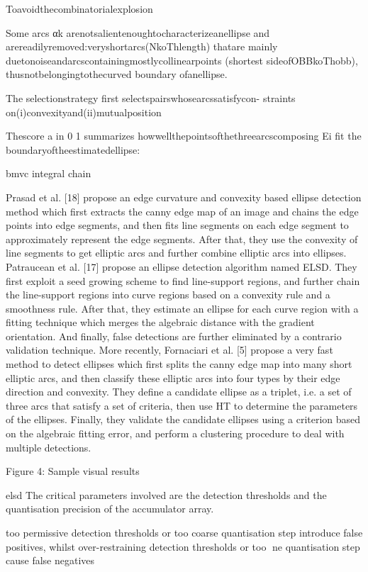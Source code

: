\documentclass[a4paper]{report}
\begin{document}
Toavoidthecombinatorialexplosion

Some arcs αk arenotsalientenoughtocharacterizeanellipse
and arereadilyremoved:veryshortarcs(NkoThlength) thatare
mainly duetonoiseandarcscontainingmostlycollinearpoints
(shortest sideofOBBkoThobb), thusnotbelongingtothecurved
boundary ofanellipse.

The selectionstrategy first selectspairswhosearcssatisfycon-
straints on(i)convexityand(ii)mutualposition


Thescore a in 0 1
summarizes howwellthepointsofthethreearcscomposing Ei fit
the boundaryoftheestimatedellipse:

bmvc integral chain

Prasad et al. [18] propose an edge curvature and convexity
based ellipse detection method which first extracts the canny edge map of an image
and chains the edge points into edge segments, and then fits line segments on each edge
segment to approximately represent the edge segments. After that, they use the convexity of
line segments to get elliptic arcs and further combine elliptic arcs into ellipses. Patraucean
et al. [17] propose an ellipse detection algorithm named ELSD. They first exploit a seed
growing scheme to find line-support regions, and further chain the line-support regions into
curve regions based on a convexity rule and a smoothness rule. After that, they estimate an
ellipse for each curve region with a fitting technique which merges the algebraic distance
with the gradient orientation. And finally, false detections are further eliminated by a contrario
validation technique. More recently, Fornaciari et al. [5] propose a very fast method
to detect ellipses which first splits the canny edge map into many short elliptic arcs, and then
classify these elliptic arcs into four types by their edge direction and convexity. They define
a candidate ellipse as a triplet, i.e. a set of three arcs that satisfy a set of criteria, then use
HT to determine the parameters of the ellipses. Finally, they validate the candidate ellipses
using a criterion based on the algebraic fitting error, and perform a clustering procedure to
deal with multiple detections.


Figure 4: Sample visual results


elsd
The critical parameters involved are the detection thresholds and the quantisation precision
of the accumulator array.

too permissive detection thresholds
or too coarse quantisation step introduce false positives, whilst over-restraining
detection thresholds or too ne quantisation step cause false negatives
\end{document}
